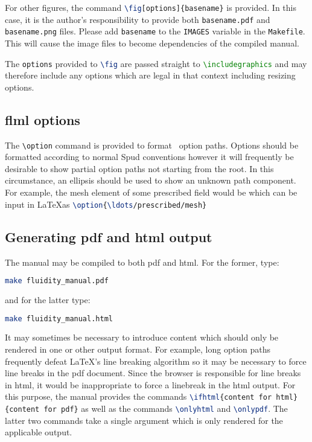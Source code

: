 For other figures, the command
\lstinline[language=TeX]+\fig[options]{basename}+ is provided. In this case,
it is the author's responsibility to provide both \verb+basename.pdf+ and
\verb+basename.png+ files. Please add \verb+basename+ to the \verb+IMAGES+
variable in the \verb+Makefile+. This will cause the image files to become
dependencies of the compiled manual.

The \lstinline[language=TeX]+options+ provided to
\lstinline[language=TeX]+\fig+ are passed straight to
\lstinline[language=TeX]+\includegraphics+ and may therefore include any
options which are legal in that context including resizing options.

\subsection{flml options}

The \verb+\option+ command is provided to format \fluidity\ option
paths. Options should be formatted according to normal Spud conventions
however it will frequently be desirable to show partial option paths not
starting from the root. In this circumstance, an ellipsis should be used to
show an unknown path component. For example, the mesh element of some
prescribed field would be  which can be input
in \LaTeX as \lstinline[language=TeX]+\option{\ldots/prescribed/mesh}+

\subsection{Generating pdf and html output}

The manual may be compiled to both pdf and html. For the former, type:
\begin{lstlisting}[language=bash]
  make fluidity_manual.pdf
\end{lstlisting}
and for the latter type:
\begin{lstlisting}[language=bash]
  make fluidity_manual.html
\end{lstlisting}
It may sometimes be necessary to introduce content which should only be
rendered in one or other output format. For example, long option paths
frequently defeat \LaTeX's line breaking algorithm so it may be necessary to
force line breaks in the pdf document. Since the browser is responsible for
line breaks in html, it would be inappropriate to force a linebreak in the
html output. For this purpose, the manual provides the commands
\lstinline[language=TeX]+\ifhtml{content for html}{content for pdf}+ as well
as the commands \lstinline[language=TeX]+\onlyhtml+ and
\lstinline[language=TeX]+\onlypdf+. The latter two commands take a single
argument which is only rendered for the applicable output.

